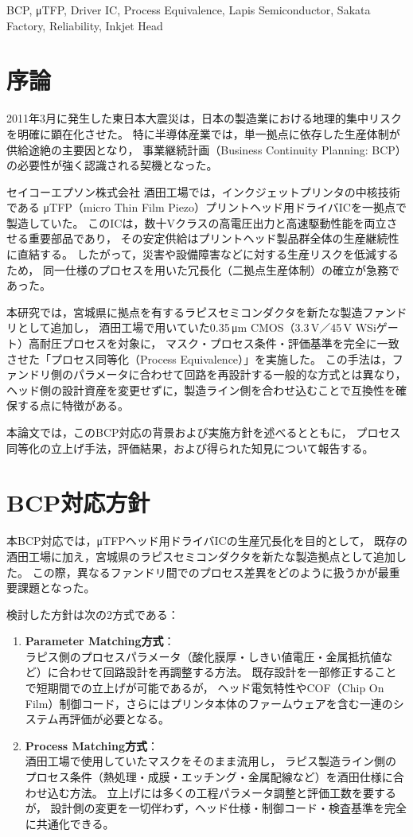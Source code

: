 \documentclass[conference]{IEEEtran}
\begin{document}
\begin{IEEEkeywords}
BCP, μTFP, Driver IC, Process Equivalence, Lapis Semiconductor, Sakata Factory, Reliability, Inkjet Head
\end{IEEEkeywords}

\section{序論}
2011年3月に発生した東日本大震災は，日本の製造業における地理的集中リスクを明確に顕在化させた。
特に半導体産業では，単一拠点に依存した生産体制が供給途絶の主要因となり，
事業継続計画（Business Continuity Planning: BCP）の必要性が強く認識される契機となった。

セイコーエプソン株式会社 酒田工場では，インクジェットプリンタの中核技術である
μTFP（micro Thin Film Piezo）プリントヘッド用ドライバICを一拠点で製造していた。
このICは，数十Vクラスの高電圧出力と高速駆動性能を両立させる重要部品であり，
その安定供給はプリントヘッド製品群全体の生産継続性に直結する。
したがって，災害や設備障害などに対する生産リスクを低減するため，
同一仕様のプロセスを用いた冗長化（二拠点生産体制）の確立が急務であった。

本研究では，宮城県に拠点を有するラピスセミコンダクタを新たな製造ファンドリとして追加し，
酒田工場で用いていた0.35\,μm CMOS（3.3\,V／45\,V WSiゲート）高耐圧プロセスを対象に，
マスク・プロセス条件・評価基準を完全に一致させた「プロセス同等化（Process Equivalence）」を実施した。
この手法は，ファンドリ側のパラメータに合わせて回路を再設計する一般的な方式とは異なり，
ヘッド側の設計資産を変更せずに，製造ライン側を合わせ込むことで互換性を確保する点に特徴がある。

本論文では，このBCP対応の背景および実施方針を述べるとともに，
プロセス同等化の立上げ手法，評価結果，および得られた知見について報告する。

\section{BCP対応方針}
本BCP対応では，μTFPヘッド用ドライバICの生産冗長化を目的として，
既存の酒田工場に加え，宮城県のラピスセミコンダクタを新たな製造拠点として追加した。
この際，異なるファンドリ間でのプロセス差異をどのように扱うかが最重要課題となった。

検討した方針は次の2方式である：
\begin{enumerate}
\item \textbf{Parameter Matching方式}：\\
ラピス側のプロセスパラメータ（酸化膜厚・しきい値電圧・金属抵抗値など）に合わせて回路設計を再調整する方法。
既存設計を一部修正することで短期間での立上げが可能であるが，
ヘッド電気特性やCOF（Chip On Film）制御コード，さらにはプリンタ本体のファームウェアを含む一連のシステム再評価が必要となる。
\item \textbf{Process Matching方式}：\\
酒田工場で使用していたマスクをそのまま流用し，
ラピス製造ライン側のプロセス条件（熱処理・成膜・エッチング・金属配線など）を酒田仕様に合わせ込む方法。
立上げには多くの工程パラメータ調整と評価工数を要するが，
設計側の変更を一切伴わず，ヘッド仕様・制御コード・検査基準を完全に共通化できる。
\end{enumerate}
\end{document}
